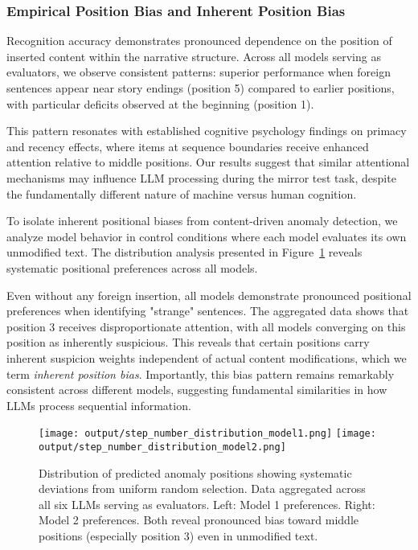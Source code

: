 \documentclass{article}
\begin{document}
\subsubsection{Empirical Position Bias and Inherent Position Bias}
Recognition accuracy demonstrates pronounced dependence on the position of inserted content within the narrative structure. Across all models serving as evaluators, we observe consistent patterns: superior performance when foreign sentences appear near story endings (position 5) compared to earlier positions, with particular deficits observed at the beginning (position 1).

This pattern resonates with established cognitive psychology findings on primacy and recency effects, where items at sequence boundaries receive enhanced attention relative to middle positions. Our results suggest that similar attentional mechanisms may influence LLM processing during the mirror test task, despite the fundamentally different nature of machine versus human cognition.

To isolate inherent positional biases from content-driven anomaly detection, we analyze model behavior in control conditions where each model evaluates its own unmodified text. The distribution analysis presented in Figure~\ref{fig:step3_reason} reveals systematic positional preferences across all models.

Even without any foreign insertion, all models demonstrate pronounced positional preferences when identifying "strange" sentences. The aggregated data shows that position 3 receives disproportionate attention, with all models converging on this position as inherently suspicious. This reveals that certain positions carry inherent suspicion weights independent of actual content modifications, which we term \emph{inherent position bias}. Importantly, this bias pattern remains remarkably consistent across different models, suggesting fundamental similarities in how LLMs process sequential information.

\begin{figure}[ht]
    \centering
    \texttt{[image: output/step\_number\_distribution\_model1.png]}
    \texttt{[image: output/step\_number\_distribution\_model2.png]}
    \caption{Distribution of predicted anomaly positions showing systematic deviations from uniform random selection. Data aggregated across all six LLMs serving as evaluators. Left: Model 1 preferences. Right: Model 2 preferences. Both reveal pronounced bias toward middle positions (especially position 3) even in unmodified text.}
    \label{fig:step3_reason}
\end{figure}
\end{document}
